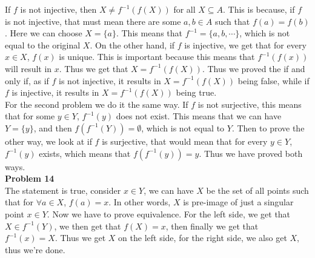 \documentclass[12pt]{article}
\begin{document}
\noindent
If $f$ is not injective, then $X \neq f^{-1}(f(X))$ for all $X \subseteq A$. This is because,
if $f$ is not injective, that must mean there are some $a, b \in A$ such that $f(a) = f(b)$. 
Here we can choose $X = \{a\}$. This means that $f^{-1} = \{a, b, \cdots \}$, which is not equal 
to the original $X$. On the other hand, if $f$ is injective, we get that for 
every $x \in X$, $f(x)$ is unique. This is important because this means that $f^{-1}(f(x))$ 
will result in $x$. Thus we get that $X = f^{-1}(f(X))$. 
Thus we proved the if and only if, as if $f$ is not injective, it results in $X = f^{-1}(f(X))$ 
being false, while if $f$ is injective, it results in $X = f^{-1}(f(X))$ being true.\\
For the second problem we do it the same way. If $f$ is not surjective, this means that for some
$y \in Y$, $f^{-1}(y)$ does not exist. This means that we can have $Y = \{y\}$, and then 
$f(f^{-1}(Y)) = \emptyset$, which is not equal to $Y$. Then to prove the other way, we look at
if $f$ is surjective, that would mean that for every $y \in Y$, $f^{-1}(y)$ exists, which means that
$f(f^{-1}(y)) = y$. Thus we have proved both ways.\\

\noindent
\textbf{Problem 14}\\

\noindent
The statement is true, consider $x \in Y$, we can have $X$ be the set of all points such that for 
$\forall a \in X$, $f(a) = x$. In other words, $X$ is pre-image of just a singular point $x \in Y$.
Now we have to prove equivalence. For the left side, we get that $X \in f^{-1}(Y)$, we then get
that $f(X) = x$, then finally we get that $f^{-1}(x) = X$. Thus we get $X$ on the left side, for 
the right side, we also get $X$, thus we're done. 
\end{document}
